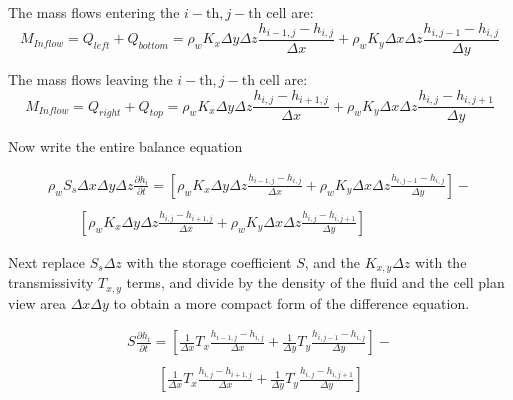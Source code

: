  The mass flows entering the $i-\text{th},j-\text{th}$ cell are:
 \begin{equation}
M_{Inflow} = Q_{left} + Q_{bottom}=
\rho_{w} K_{x} \Delta y \Delta z \frac{h_{i-1,j} - h_{i,j}}{\Delta x} +
\rho_{w} K_{y} \Delta x \Delta z \frac{h_{i,j-1} - h_{i,j}}{\Delta y}                  
\end{equation}
 
The mass flows leaving the $i-\text{th},j-\text{th}$ cell are:
\begin{equation}
M_{Inflow} = Q_{right} + Q_{top}=
\rho_{w} K_{x} \Delta y \Delta z \frac{h_{i,j} - h_{i+1,j}}{\Delta x} +
\rho_{w} K_{y} \Delta x \Delta z \frac{h_{i,j} - h_{i,j+1}}{\Delta y}                  
\end{equation}

Now write the entire balance equation

\begin{equation}
\begin{matrix}
\rho_{w} S_{s} \Delta x \Delta y \Delta z \frac{\partial h_i}{\partial t} = 
[\rho_{w} K_{x} \Delta y \Delta z \frac{h_{i-1,j} - h_{i,j}}{\Delta x} +
\rho_{w} K_{y} \Delta x \Delta z \frac{h_{i,j-1} - h_{i,j}}{\Delta y}] - \\
~~~~~~~~~~\\
~~~~~~~~~~[\rho_{w} K_{x} \Delta y \Delta z \frac{h_{i,j} - h_{i+1,j}}{\Delta x} +
\rho_{w} K_{y} \Delta x \Delta z \frac{h_{i,j} - h_{i,j+1}}{\Delta y} ]        
\end{matrix}        
\end{equation}

Next replace $S_s \Delta z$ with the storage coefficient $S$, and the $K_{x,y} \Delta z$ with the transmissivity $T_{x,y}$ terms, and divide by the density of the fluid and the cell plan view area $\Delta x \Delta y$ to obtain a more compact form of the difference equation.

\begin{equation}
\begin{matrix}
S \frac{\partial h_i}{\partial t} = 
[\frac{1}{\Delta x} T_{x} \frac{h_{i-1,j} - h_{i,j}}{\Delta x} +
 \frac{1}{\Delta y} T_{y} \frac{h_{i,j-1} - h_{i,j}}{\Delta y}] - \\
~~~~~~~~~~\\
~~~~~~~~~~[ \frac{1}{\Delta x} T_{x}  \frac{h_{i,j} - h_{i+1,j}}{\Delta x} +
  \frac{1}{\Delta y}  T_{y} \frac{h_{i,j} - h_{i,j+1}}{\Delta y} ]        
\end{matrix}        
\end{equation}

